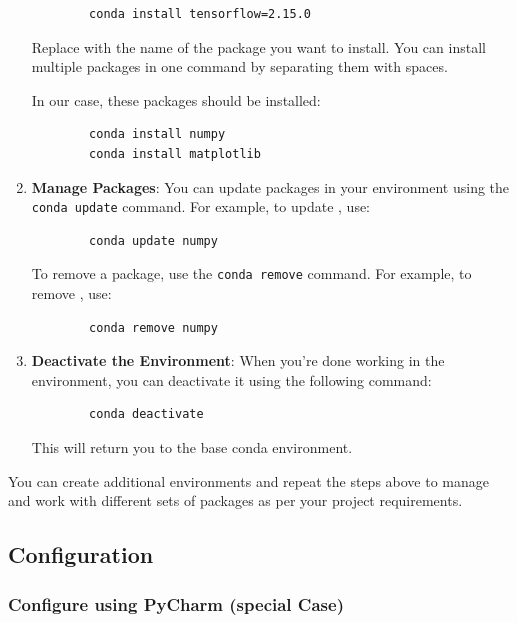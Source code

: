\begin{enumerate}
	\begin{verbatim}
		conda install tensorflow=2.15.0
	\end{verbatim}
	
	Replace  with the name of the package you want to install. You can install multiple packages in one command by separating them with spaces.
	
	In our case, these packages should be installed:
	
	\begin{verbatim}
		conda install numpy
		conda install matplotlib
	\end{verbatim}
	
	\item \textbf{Manage Packages}: You can update packages in your environment using the \texttt{conda update} command. For example, to update , use:
	
	\begin{verbatim}
		conda update numpy
	\end{verbatim}
	
	To remove a package, use the \texttt{conda remove} command. For example, to remove , use:
	
	\begin{verbatim}
		conda remove numpy
	\end{verbatim}
	
	\item \textbf{Deactivate the Environment}: When you're done working in the environment, you can deactivate it using the following command:
	
	\begin{verbatim}
		conda deactivate
	\end{verbatim}
	
	This will return you to the base conda environment.
\end{enumerate}

You can create additional environments and repeat the steps above to manage and work with different sets of packages as per your project requirements.


\subsection{Configuration}

\subsubsection{Configure using PyCharm (special Case)}

